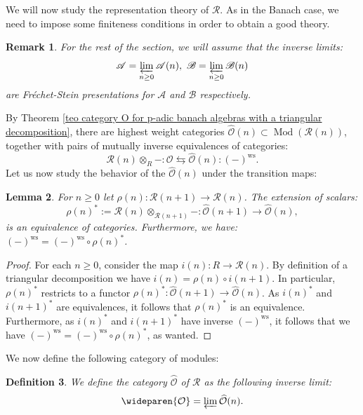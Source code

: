\documentclass{amsart}
\newtheorem{defi}{ Definition}[subsection]
\newtheorem{obs}[defi]{{Remark}}
\newtheorem{Lemma}[defi]{Lemma}
\newcommand{\Mod}{\operatorname{Mod}}
\newcommand{\OX}{\mathcal{O}}
\begin{document}
We will now study the representation theory of $\mathscr{R}$. As in the Banach case, we need to impose some finiteness conditions in order to obtain a good theory.
\begin{obs}\label{remark conditions for Frechet category O}
For the rest of the section, we will assume that the inverse limits:
\begin{equation*}
    \mathscr{A}=\varprojlim_{n\geq 0}\mathscr{A}(n), \textnormal{ } \mathscr{B}=\varprojlim_{n\geq 0}\mathscr{B}(n)
\end{equation*}
are Fréchet-Stein presentations for $\mathscr{A}$ and $\mathscr{B}$ respectively.
\end{obs}
By Theorem \ref{teo category O for p-adic banach algebras with a triangular decomposition}, there are highest weight categories $\widehat{\OX}(n)\subset \Mod(\mathscr{R}(n))$, together with pairs of mutually inverse equivalences of categories:
\begin{equation}\label{equation equiv of categories Ocm}
    \mathscr{R}(n)\otimes_{R}-:\OX\leftrightarrows \widehat{\OX}(n):(-)^{\operatorname{ws}}.
\end{equation}
Let us now study the behavior of the $\widehat{\OX}(n)$ under the transition maps:
\begin{Lemma}\label{Lemma transition maps category O}
For $n\geq 0$ let $\rho(n):\mathscr{R}(n+1)\rightarrow \mathscr{R}(n)$. The extension of scalars:
\begin{equation*}
    \rho(n)^*:=\mathscr{R}(n)\otimes_{\mathscr{R}(n+1)}-:\widehat{\OX}(n+1)\rightarrow \widehat{\OX}(n),
\end{equation*}
is an equivalence of categories. Furthermore, we have: $(-)^{\operatorname{ws}}=(-)^{\operatorname{ws}}\circ\rho(n)^*$.
\end{Lemma}
\begin{proof}
For each $n\geq 0$, consider the map $i(n):R\rightarrow \mathscr{R}(n)$. By definition of a triangular decomposition we have $i(n)=\rho(n)\circ i(n+1)$. In particular, $\rho(n)^*$ restricts to a functor $\rho(n)^*:\widehat{\OX}(n+1)\rightarrow \widehat{\OX}(n)$. As $i(n)^*$ and $i(n+1)^*$ are equivalences, it follows that $\rho(n)^*$ is an equivalence. Furthermore, as $i(n)^*$ and $i(n+1)^*$ have inverse $(-)^{\operatorname{ws}}$, it follows that we have $(-)^{\operatorname{ws}}=(-)^{\operatorname{ws}}\circ\rho(n)^*$, as wanted.
\end{proof}
We now define the following category of modules:
\begin{defi}
We define the category $\wideparen{\OX}$ of $\mathscr{R}$ as the following inverse limit:
\begin{equation*}
    \wideparen{\OX}=\varprojlim \widehat{\OX}(n).
\end{equation*}
\end{defi}
\end{document}
